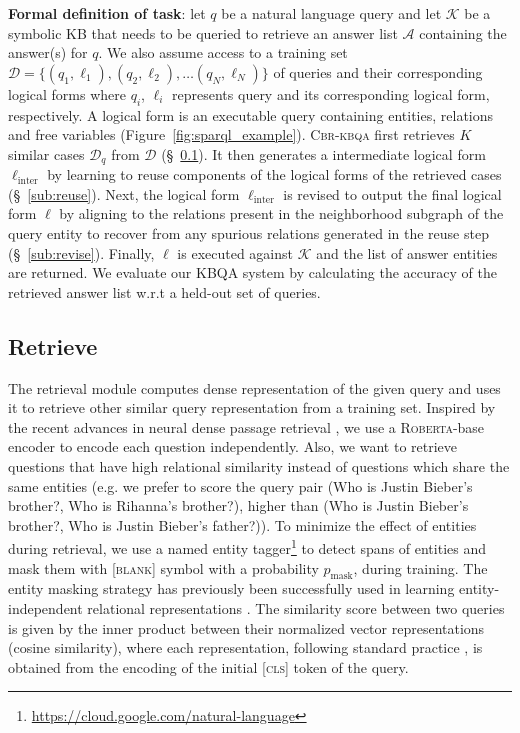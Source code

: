 \documentclass[11pt]{article}
\newcommand{\roberta}{\textsc{Roberta}\xspace}
\newcommand{\alg}{\textsc{Cbr-kbqa}\xspace}
\begin{document}
\noindent\textbf{Formal definition of task}: let $q$ be a natural language query and let $\mathcal{K}$ be a symbolic KB that needs to be queried to retrieve an answer list $\mathcal{A}$ containing the answer(s) for $q$. We also assume access to a training set $\mathcal{D} = \{(q_1, \ell_1), (q_2, \ell_2), \ldots (q_N, \ell_N)\}$ of queries and their corresponding logical forms where $q_i$, $\ell_i$  represents query and its corresponding logical form, respectively. A logical form is an executable query containing entities, relations and free variables (Figure~\ref{fig:sparql_example}). \alg first retrieves $K$ similar cases $\mathcal{D}_q$  from $\mathcal{D}$ (\S~\ref{sub:retrieval}). It then generates a intermediate logical form $\ell_{\textrm{inter}}$ by learning to reuse components of the logical forms of the retrieved cases (\S~\ref{sub:reuse}). Next, the logical form $\ell_{\textrm{inter}}$ is revised to output the final logical form $\ell$ by aligning to the relations present in the neighborhood subgraph of the query entity to recover from any spurious relations generated in the reuse step (\S~\ref{sub:revise}). Finally, $\ell$ is executed against $\mathcal{K}$ and the list of answer entities are returned. We evaluate our KBQA system by calculating the accuracy of the retrieved answer list w.r.t a held-out set of queries.

\subsection{Retrieve}
\label{sub:retrieval}
The retrieval module computes dense representation of the given query and uses it to retrieve other similar query representation from a training set. Inspired by the recent advances in neural dense passage retrieval \cite{das2019multi,karpukhin2020dense}, we use a \roberta-base encoder to encode each question independently. Also, we want to retrieve questions that have high relational similarity instead of questions which share the same entities (e.g. we prefer to score the query pair (Who is Justin Bieber's brother?, Who is Rihanna's brother?), higher than (Who is Justin Bieber's brother?, Who is Justin Bieber's father?)). To minimize the effect of entities during retrieval, we use a named entity tagger\footnote{\url{https://cloud.google.com/natural-language}} to detect spans of entities and mask them with \textsc{[blank]} symbol with a probability $p_{\textrm{mask}}$, during training. The entity masking strategy has previously been successfully used in learning entity-independent relational representations \cite{soares2019matching}. The similarity score between two queries is given by the inner product between their normalized vector representations (cosine similarity), where each representation, following standard practice \cite{guu2020realm}, is obtained from the encoding of the initial \textsc{[cls]} token of the query. 
\end{document}
